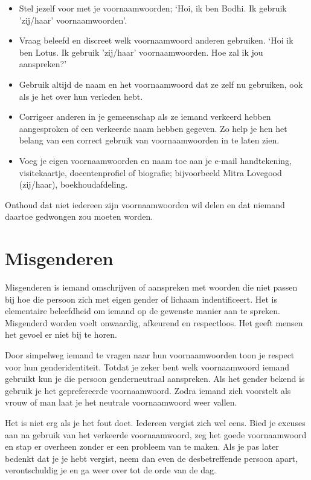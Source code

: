\documentclass[12pt,openany]{book}
\begin{document}
\begin{itemize}
\setlength\itemsep{0em}
\item Stel jezelf voor met je voornaamwoorden; ‘Hoi, ik ben Bodhi. Ik gebruik ’zij/haar’ voornaamwoorden’. 
\item Vraag beleefd en discreet welk voornaamwoord anderen gebruiken. ‘Hoi ik ben Lotus. Ik gebruik ’zij/haar’ voornaamwoorden. Hoe zal ik jou aanspreken?’ 
\item Gebruik altijd de naam en het voornaamwoord dat ze zelf nu gebruiken, ook als je het over hun verleden hebt.
\item Corrigeer anderen in je gemeenschap als ze iemand verkeerd hebben aangesproken of een verkeerde naam hebben gegeven. Zo help je hen het belang van een correct gebruik van voornaamwoorden in te laten zien.
\item Voeg je eigen voornaamwoorden en naam toe aan je e-mail handtekening, visitekaartje, docentenprofiel of biografie; bijvoorbeeld Mitra Lovegood (zij/haar), boekhoudafdeling.
\end{itemize}

Onthoud dat niet iedereen zijn voornaamwoorden wil delen en dat niemand daartoe gedwongen zou moeten worden. 

\section*{Misgenderen}

Misgenderen is iemand omschrijven of aanspreken met woorden die niet passen bij hoe die persoon zich met eigen gender of lichaam indentificeert. 
Het is elementaire beleefdheid om iemand op de gewenste manier aan te spreken. Misgenderd worden voelt onwaardig, afkeurend en respectloos. Het geeft mensen het gevoel er niet bij te horen. 

Door simpelweg iemand te vragen naar hun voornaamwoorden toon je respect voor hun genderidentiteit. Totdat je zeker bent welk voornaamwoord iemand gebruikt kun je die persoon genderneutraal aanspreken. Als het gender bekend is gebruik je het geprefereerde voornaamwoord. Zodra iemand zich voorstelt als vrouw of man laat je het neutrale voornaamwoord weer vallen.

Het is niet erg als je het fout doet. Iedereen vergist zich wel eens. Bied je excuses aan na gebruik van het verkeerde voornaamwoord, zeg het goede voornaamwoord en stap er overheen zonder er een probleem van te maken. Als je pas later bedenkt dat je je hebt vergist, neem dan even de desbetreffende persoon apart, verontschuldig je en ga weer over tot de orde van de dag.
\end{document}

